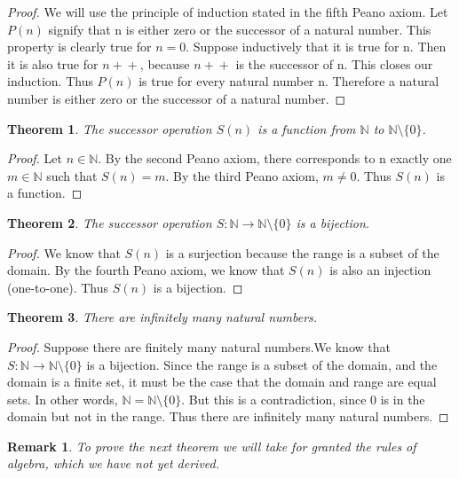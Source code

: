 \documentclass{article}
\newtheorem{theorem}{Theorem}
\newtheorem{remark}{Remark}
\newcommand{\inc}[1]{#1\!+\!+}
\begin{document}
\begin{proof}
We will use the principle of induction stated in the fifth Peano axiom. Let $P(n)$ signify that n is either zero or the successor of a natural number. This property is clearly true for $n = 0$. Suppose inductively that it is true for n. Then it is also true for $\inc{n}$, because $\inc{n}$ is the successor of n. This closes our induction. Thus $P(n)$ is true for every natural number n. Therefore a natural number is either zero or the successor of a natural number.
\end{proof}

\begin{theorem}
The successor operation $S(n)$ is a function from $\mathbb{N}$ to $\mathbb{N}\setminus\{0\}$.
\end{theorem}

\begin{proof}
Let $n \in \mathbb{N}$. By the second Peano axiom, there corresponds to n exactly one $m \in \mathbb{N}$ such that $S(n) = m$. By the third Peano axiom, $m \neq 0$. Thus $S(n)$ is a function.
\end{proof}

\begin{theorem}
The successor operation $S : \mathbb{N} \to \mathbb{N}\setminus\{0\}$ is a bijection.
\end{theorem}

\begin{proof}
We know that $S(n)$ is a surjection because the range is a subset of the domain. By the fourth Peano axiom, we know that $S(n)$ is also an injection (one-to-one). Thus $S(n)$ is a bijection.
\end{proof}

\begin{theorem}
There are infinitely many natural numbers. 
\end{theorem}

\begin{proof}
Suppose there are finitely many natural numbers.We know that $S : \mathbb{N} \to \mathbb{N}\setminus\{0\}$ is a bijection. Since the range is a subset of the domain, and the domain is a finite set, it must be the case that the domain and range are equal sets. In other words, $\mathbb{N} = \mathbb{N}\setminus\{0\}$. But this is a contradiction, since 0 is in the domain but not in the range. Thus there are infinitely many natural numbers. 
\end{proof}

\begin{remark}
To prove the next theorem we will take for granted the rules of algebra, which we have not yet derived.
\end{remark}
\end{document}
